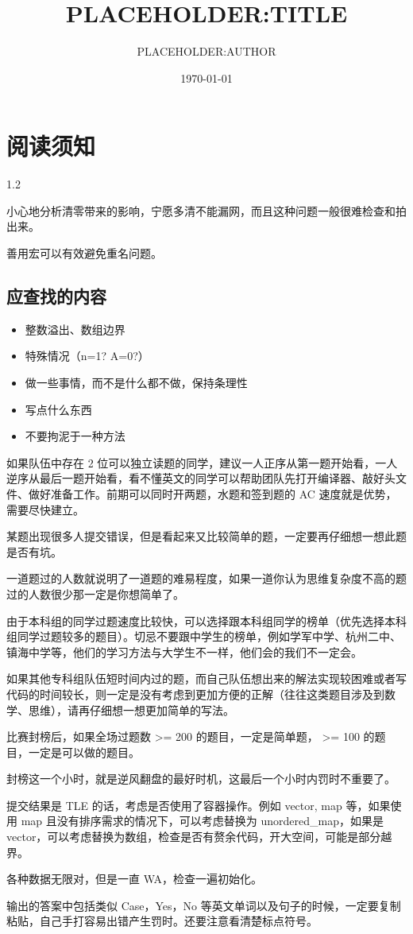 \documentclass{article}
\title{{PLACEHOLDER:TITLE}}
\author{{PLACEHOLDER:AUTHOR}}
\date{\today}
\begin{document}
\maketitle
{
  \hypersetup{linkcolor=black}
  \tableofcontents
}

\newpage
\section*{阅读须知}

\begin{spacing}{1.2}
\setlength{\parskip}{0.8\baselineskip}

小心地分析清零带来的影响，宁愿多清不能漏网，而且这种问题一般很难检查和拍出来。

善用宏可以有效避免重名问题。

\subsection*{应查找的内容}
\begin{itemize}
    \item 整数溢出、数组边界
    \item 特殊情况（n=1? A=0?）
    \item 做一些事情，而不是什么都不做，保持条理性
    \item 写点什么东西
    \item 不要拘泥于一种方法
\end{itemize}

如果队伍中存在 2 位可以独立读题的同学，建议一人正序从第一题开始看，一人逆序从最后一题开始看，看不懂英文的同学可以帮助团队先打开编译器、敲好头文件、做好准备工作。前期可以同时开两题，水题和签到题的 AC 速度就是优势，需要尽快建立。

某题出现很多人提交错误，但是看起来又比较简单的题，一定要再仔细想一想此题是否有坑。

一道题过的人数就说明了一道题的难易程度，如果一道你认为思维复杂度不高的题过的人数很少那一定是你想简单了。

由于本科组的同学过题速度比较快，可以选择跟本科组同学的榜单（优先选择本科组同学过题较多的题目）。切忌不要跟中学生的榜单，例如学军中学、杭州二中、镇海中学等，他们的学习方法与大学生不一样，他们会的我们不一定会。

如果其他专科组队伍短时间内过的题，而自己队伍想出来的解法实现较困难或者写代码的时间较长，则一定是没有考虑到更加方便的正解（往往这类题目涉及到数学、思维），请再仔细想一想更加简单的写法。

比赛封榜后，如果全场过题数 >= 200 的题目，一定是简单题， >= 100 的题目，一定是可以做的题目。

封榜这一个小时，就是逆风翻盘的最好时机，这最后一个小时内罚时不重要了。

提交结果是 TLE 的话，考虑是否使用了容器操作。例如 vector, map 等，如果使用 map 且没有排序需求的情况下，可以考虑替换为 unordered\_map，如果是 vector，可以考虑替换为数组，检查是否有赘余代码，开大空间，可能是部分越界。

各种数据无限对，但是一直 WA，检查一遍初始化。

输出的答案中包括类似 Case，Yes，No 等英文单词以及句子的时候，一定要复制粘贴，自己手打容易出错产生罚时。还要注意看清楚标点符号。

\end{spacing}

\newpage
\end{document}
